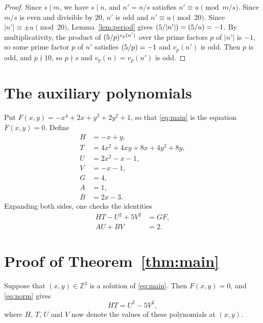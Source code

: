 \documentclass[11pt]{article}
\newcommand{\Z}{\mathbb{Z}}
\newcommand{\leg}[2]{\mathchoice{\biggl(\dfrac{#1}{#2}\biggr)}{(#1/#2)}{(#1/#2)}{(#1/#2)}}
\begin{document}
\begin{proof}
Since $s\mid m$, we have $s\mid n$, and $n'=n/s$ satisfies $n'\equiv u\pmod{m/s}$. Since $m/s$ is even and divisible by $20$, $n'$ is odd and $n'\equiv u\pmod{20}$. Since $|n'|\equiv\pm u\pmod{20}$, Lemma~\ref{lem:period} gives $\leg{5}{|n'|}=\leg{5}{u}=-1$. By multiplicativity, the product of $\leg{5}{p}^{v_p(n')}$ over the prime factors $p$ of $|n'|$ is $-1$, so some prime factor $p$ of $n'$ satisfies $\leg{5}{p}=-1$ and $v_p(n')$ is odd. Then $p$ is odd, and $p\nmid10$, so $p\nmid s$ and $v_p(n)=v_p(n')$ is odd.
\end{proof}

\section{The auxiliary polynomials}

Put $F(x,y)=-x^{4}+2x+y^{3}+2y^{2}+1$, so that \eqref{eq:main} is the equation $F(x,y)=0$. Define
\begin{align*}
H&=-x+y,\\
T&=4x^{2}+4xy+8x+4y^{2}+8y,\\
U&=2x^{2}-x-1,\\
V&=-x-1,\\
G&=4,\\
A&=1,\\
B&=2x-3.
\end{align*}
Expanding both sides, one checks the identities
\begin{align}
HT-U^2+5V^2&=GF,\label{eq:norm}\\
AU+BV&=2.\label{eq:bezout}
\end{align}

\section{Proof of Theorem~\ref{thm:main}}

Suppose that $(x,y)\in\Z^2$ is a solution of \eqref{eq:main}. Then $F(x,y)=0$, and \eqref{eq:norm} gives
\begin{equation}\label{eq:HT}
HT=U^2-5V^2,
\end{equation}
where $H$, $T$, $U$ and $V$ now denote the values of these polynomials at $(x,y)$.
\end{document}
